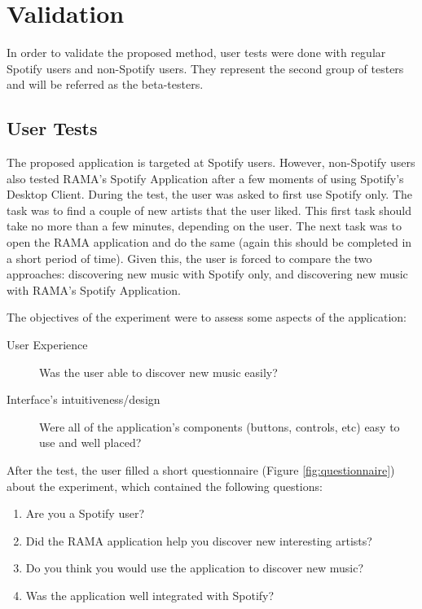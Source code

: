 

  \clearpage

\section{Validation} %
\label{sec:validation}

  In order to validate the proposed method, user tests were done with regular Spotify users and non-Spotify users.
  They represent the second group of testers and will be referred as the beta-testers.

  \subsection{User Tests} %
  \label{sub:user_tests}

    The proposed application is targeted at Spotify users.
    However, non-Spotify users also tested RAMA's Spotify Application after a few moments of using Spotify's Desktop Client.
    During the test, the user was asked to first use Spotify only.
    The task was to find a couple of new artists that the user liked.
    This first task should take no more than a few minutes, depending on the user.
    The next task was to open the RAMA application and do the same (again this should be completed in a short period of time).
    Given this, the user is forced to compare the two approaches: discovering new music with Spotify only, and discovering new music with RAMA's Spotify Application.

    The objectives of the experiment were to assess some aspects of the application:

    \begin{description}
      \item[User Experience]
        Was the user able to discover new music easily?
      \item[Interface's intuitiveness/design]
        Were all of the application's components (buttons, controls, etc) easy to use and well placed?
    \end{description}

    After the test, the user filled a short questionnaire (Figure \ref{fig:questionnaire}) about the experiment, which contained the following questions:

    \begin{enumerate}
      \item Are you a Spotify user?
      \item Did the RAMA application help you discover new interesting artists?
      \item Do you think you would use the application to discover new music?
      \item Was the application well integrated with Spotify?
    \end{enumerate}


